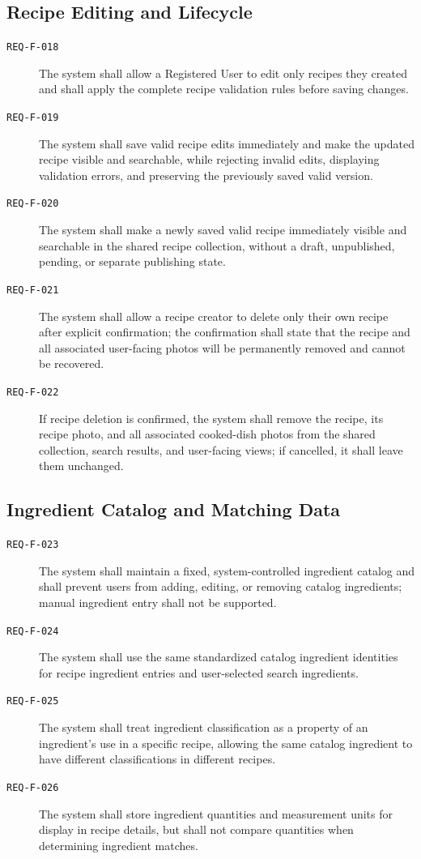 \documentclass[12pt]{article}
\begin{document}
\subsection{Recipe Editing and Lifecycle}
\begin{description}
    \item[\texttt{REQ-F-018}] The system shall allow a Registered User to edit only recipes they created and shall apply the complete recipe validation rules before saving changes.
    \item[\texttt{REQ-F-019}] The system shall save valid recipe edits immediately and make the updated recipe visible and searchable, while rejecting invalid edits, displaying validation errors, and preserving the previously saved valid version.
    \item[\texttt{REQ-F-020}] The system shall make a newly saved valid recipe immediately visible and searchable in the shared recipe collection, without a draft, unpublished, pending, or separate publishing state.
    \item[\texttt{REQ-F-021}] The system shall allow a recipe creator to delete only their own recipe after explicit confirmation; the confirmation shall state that the recipe and all associated user-facing photos will be permanently removed and cannot be recovered.
    \item[\texttt{REQ-F-022}] If recipe deletion is confirmed, the system shall remove the recipe, its recipe photo, and all associated cooked-dish photos from the shared collection, search results, and user-facing views; if cancelled, it shall leave them unchanged.
\end{description}

\subsection{Ingredient Catalog and Matching Data}
\begin{description}
    \item[\texttt{REQ-F-023}] The system shall maintain a fixed, system-controlled ingredient catalog and shall prevent users from adding, editing, or removing catalog ingredients; manual ingredient entry shall not be supported.
    \item[\texttt{REQ-F-024}] The system shall use the same standardized catalog ingredient identities for recipe ingredient entries and user-selected search ingredients.
    \item[\texttt{REQ-F-025}] The system shall treat ingredient classification as a property of an ingredient's use in a specific recipe, allowing the same catalog ingredient to have different classifications in different recipes.
    \item[\texttt{REQ-F-026}] The system shall store ingredient quantities and measurement units for display in recipe details, but shall not compare quantities when determining ingredient matches.
\end{description}
\end{document}
